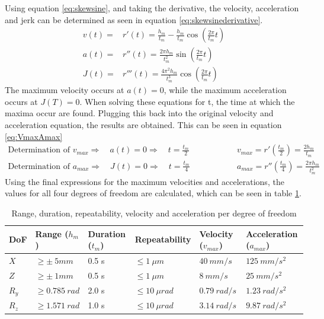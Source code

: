 Using equation \ref{eq:skewsine}, and taking the derivative, the velocity, acceleration and jerk can be determined as seen in equation \ref{eq:skewsinederivative}. 
\begin{equation} \label{eq:skewsinederivative}
\begin{aligned}
v(t)=&r'(t)=\frac{h_m}{t_m}-\frac{h_m}{t_m}\cos\left(\frac{2\pi}{t_m}t\right) \\ 
a(t)=&r''(t)=\frac{2\pi h_m}{t_m^2}\sin\left(\frac{2\pi}{t_m}t\right) \\ 
J(t)=&r'''(t)=\frac{4\pi^2h_m}{t_m^3}\cos\left(\frac{2\pi}{t_m}t\right)
\end{aligned}
\end{equation}
The maximum velocity occurs at $a(t)=0$, while the maximum acceleration occurs at $J(T)=0$. When solving these equations for t, the time at which the maxima occur are found. Plugging this back into the original velocity and acceleration equation, the results are obtained. This can be seen in equation \ref{eq:VmaxAmax}
\begin{equation} \label{eq:VmaxAmax}
\begin{aligned}
\text{Determination of $v_{max}$} \Rightarrow \quad a(t)=0 \Rightarrow \quad t=\frac{t_m}{2} \quad \quad \quad \quad  \quad \quad & v_{max}=r'\left(\frac{t_m}{2}\right)=\frac{2h_m}{t_m} \\
\text{Determination of $a_{max}$} \Rightarrow \quad J(t)=0 \Rightarrow \quad t=\frac{t_m}{4} \quad \quad \quad \quad  \quad \quad & a_{max}=r''\left(\frac{t_m}{4}\right)=\frac{2\pi h_m}{t_m^2}
\end{aligned}
\end{equation}
Using the final expressions for the maximum velocities and accelerations, the values for all four degrees of freedom are calculated, which can be seen in table \ref{tab:requirements}.
\begin{table}[ht]
\centering
\caption{Range, duration, repeatability, velocity and acceleration per degree of freedom}
\label{tab:requirements}
\begin{tabular}{l|lllll}
\textbf{DoF} & \textbf{Range ($h_m$)}    & \textbf{Duration ($t_m$)} 	& \textbf{Repeatability} & \textbf{Velocity ($v_{max}$)} & \textbf{Acceleration ($a_{max}$)} \\ \hline
$X$                & $ \geq \pm \ 5 mm $ 		& 0.5 s 						& $\leq 1\ \mu m$         & $ 40\ mm/s $        & $  125\ mm/s^2 $                    \\
$Z$                & $ \geq \pm \ 1 mm$  		& 0.5 s						& $\leq 1\ \mu m$            &$  8\ mm/s $       &  $ 25\ mm/s^2 $                    \\
$R_y$              & $ \geq 0.785\ rad $       & 2.0 s							& $\leq 10\ \mu rad$         & $ 0.79\ rad/s$  &   $  1.23\ rad/s^2 $                \\
$R_z$              & $ \geq  1.571 \ rad $     		& 1.0	s				    & $\leq 10\ \mu rad$         & $ 3.14\ rad/s $ &   $  9.87\ rad/s^2$                 
\end{tabular}
\end{table}

